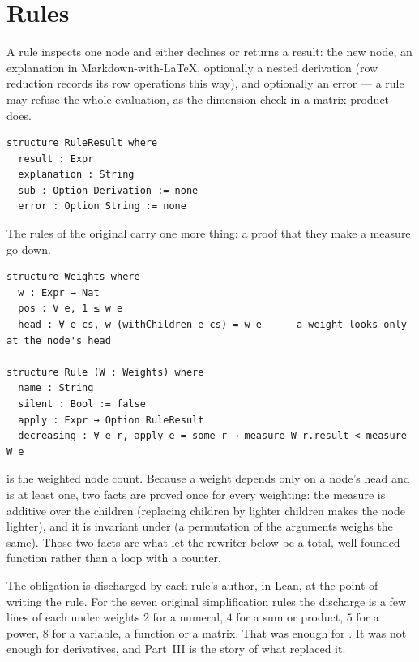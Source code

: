 \section{Rules}

A rule inspects one node and either declines or returns a result: the new node, an explanation
in Markdown-with-\LaTeX, optionally a nested derivation (row reduction records its row operations
this way), and optionally an error --- a rule may refuse the whole evaluation, as the dimension
check in a matrix product does.

\begin{verbatim}
structure RuleResult where
  result : Expr
  explanation : String
  sub : Option Derivation := none
  error : Option String := none
\end{verbatim}

The rules of the original  carry one more thing: a proof that they make a measure go
down.

\begin{verbatim}
structure Weights where
  w : Expr → Nat
  pos : ∀ e, 1 ≤ w e
  head : ∀ e cs, w (withChildren e cs) = w e   -- a weight looks only at the node's head

structure Rule (W : Weights) where
  name : String
  silent : Bool := false
  apply : Expr → Option RuleResult
  decreasing : ∀ e r, apply e = some r → measure W r.result < measure W e
\end{verbatim}

 is the weighted node count. Because a weight depends only on a node's head and is
at least one, two facts are proved once for every weighting: the measure is additive over the
children (replacing children by lighter children makes the node lighter), and it is invariant
under  (a permutation of the arguments weighs the same). Those two facts are what let
the rewriter below be a total, well-founded function rather than a loop with a counter.

\begin{notebox}
  The obligation  is discharged by each rule's author, in Lean, at the point of
  writing the rule. For the seven original simplification rules the discharge is a few lines of
   each under weights $2$ for a numeral, $4$ for a sum or product, $5$ for a power, $8$
  for a variable, a function or a matrix. That was enough for . It was not enough for
  derivatives, and Part~III is the story of what replaced it.
\end{notebox}

